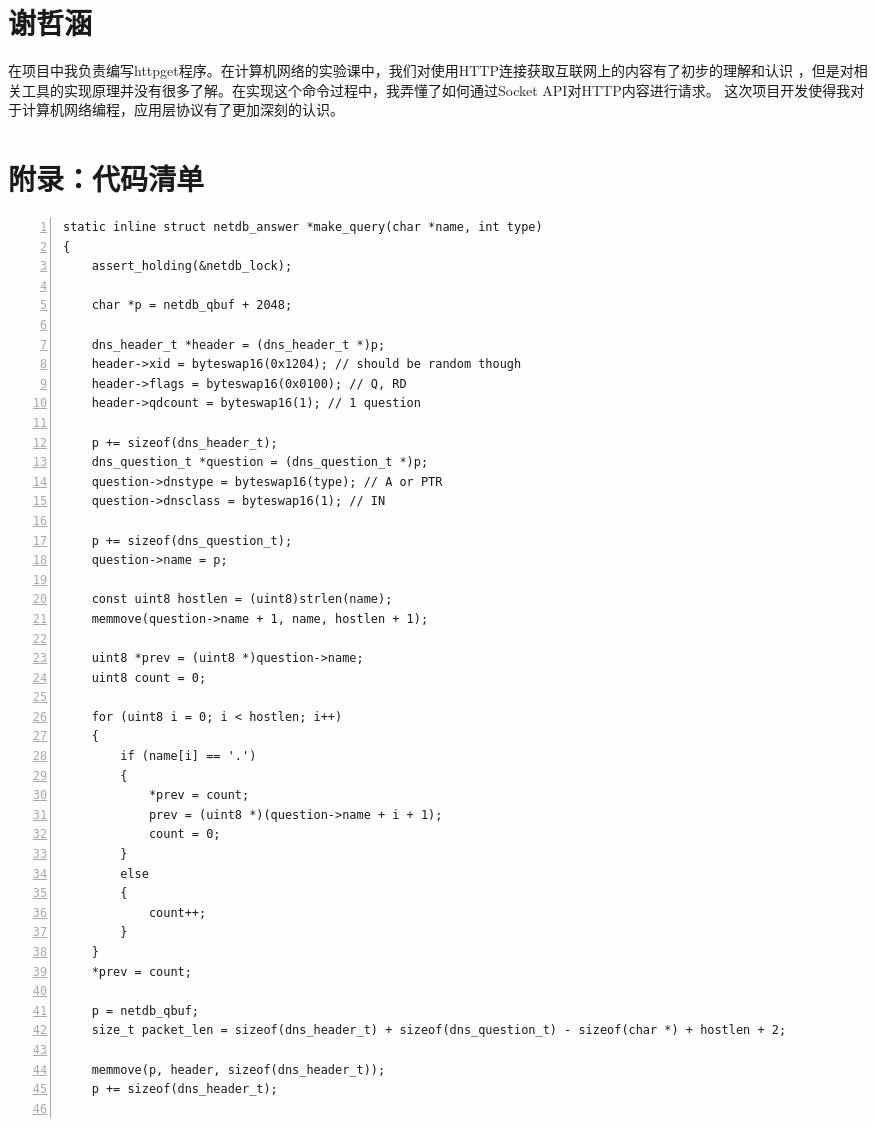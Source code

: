 \documentclass[a4paper,twoside]{ctexrep}
\begin{document}
\begin{spacing}{1.2}
\section{谢哲涵}

在项目中我负责编写httpget程序。在计算机网络的实验课中，我们对使用HTTP连接获取互联网上的内容有了初步的理解和认识
，但是对相关工具的实现原理并没有很多了解。在实现这个命令过程中，我弄懂了如何通过Socket API对HTTP内容进行请求。
这次项目开发使得我对于计算机网络编程，应用层协议有了更加深刻的认识。

\clearpage
{}




\clearpage
\section*{附录：代码清单}
\label{sec:appdixcode}

\begin{lstlisting}[numbers=left,style=CppStyle,caption={DNS报文构造},label={code:dnsquery}]
static inline struct netdb_answer *make_query(char *name, int type)
{
	assert_holding(&netdb_lock);

	char *p = netdb_qbuf + 2048;

	dns_header_t *header = (dns_header_t *)p;
	header->xid = byteswap16(0x1204); // should be random though
	header->flags = byteswap16(0x0100); // Q, RD
	header->qdcount = byteswap16(1); // 1 question

	p += sizeof(dns_header_t);
	dns_question_t *question = (dns_question_t *)p;
	question->dnstype = byteswap16(type); // A or PTR
	question->dnsclass = byteswap16(1); // IN

	p += sizeof(dns_question_t);
	question->name = p;

	const uint8 hostlen = (uint8)strlen(name);
	memmove(question->name + 1, name, hostlen + 1);

	uint8 *prev = (uint8 *)question->name;
	uint8 count = 0;

	for (uint8 i = 0; i < hostlen; i++)
	{
		if (name[i] == '.')
		{
			*prev = count;
			prev = (uint8 *)(question->name + i + 1);
			count = 0;
		}
		else
		{
			count++;
		}
	}
	*prev = count;

	p = netdb_qbuf;
	size_t packet_len = sizeof(dns_header_t) + sizeof(dns_question_t) - sizeof(char *) + hostlen + 2;

	memmove(p, header, sizeof(dns_header_t));
	p += sizeof(dns_header_t);


\end{lstlisting}
\end{spacing}
\end{document}
